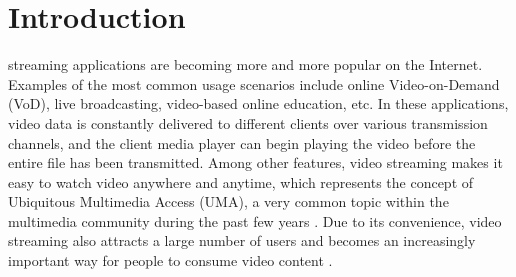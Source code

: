 \documentclass[journal]{IEEEtran}
\begin{document}
%
\IEEEpeerreviewmaketitle



\section{Introduction}
\label{sec:intro}
% 
% 
% 
% 
 streaming applications are becoming more and more popular on the Internet. Examples of the most common usage scenarios include online Video-on-Demand (VoD), live broadcasting, video-based online education, etc. In these applications, video data is constantly delivered to different clients over various transmission channels, and the client media player can begin playing the video before the entire file has been transmitted. Among other features, video streaming makes it easy to watch video anywhere and anytime, which represents the concept of Ubiquitous Multimedia Access (UMA), a very common topic within the multimedia community during the past few years \cite{Gualdi08}. Due to its convenience, video streaming also attracts a large number of users and becomes an increasingly important way for people to consume video content \cite{Chen13}.
\end{document}
